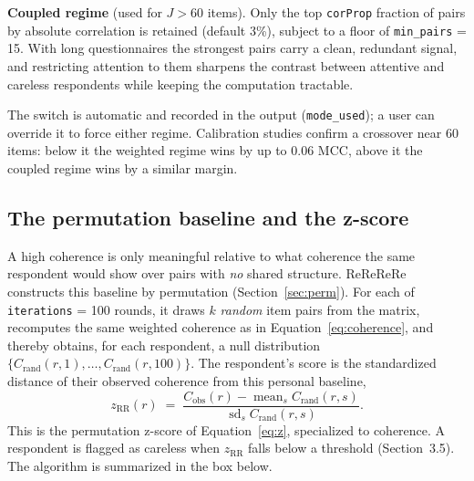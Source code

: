 \textbf{Coupled regime} (used for $J > 60$ items). Only the top
\texttt{corProp} fraction of pairs by absolute correlation is retained (default
3\%), subject to a floor of \texttt{min\_pairs} = 15. With long questionnaires
the strongest pairs carry a clean, redundant signal, and restricting attention
to them sharpens the contrast between attentive and careless respondents while
keeping the computation tractable.

The switch is automatic and recorded in the output (\texttt{mode\_used}); a user
can override it to force either regime. Calibration studies confirm a crossover
near 60 items: below it the weighted regime wins by up to $0.06$ MCC, above it
the coupled regime wins by a similar margin.

\subsection{The permutation baseline and the z-score}

A high coherence is only meaningful relative to what coherence the same
respondent would show over pairs with \emph{no} shared structure. ReReReRe
constructs this baseline by permutation (Section~\ref{sec:perm}). For each of
\texttt{iterations} = 100 rounds, it draws $k$ \emph{random} item pairs from the
matrix, recomputes the same weighted coherence as in
Equation~\ref{eq:coherence}, and thereby obtains, for each respondent, a null
distribution $\{C_{\text{rand}}(r,1), \dots, C_{\text{rand}}(r,100)\}$. The
respondent's score is the standardized distance of their observed coherence from
this personal baseline,
\begin{equation}
z_{\text{RR}}(r) \;=\;
\frac{C_{\text{obs}}(r) - \operatorname{mean}_s C_{\text{rand}}(r,s)}
{\operatorname{sd}_s C_{\text{rand}}(r,s)} .
\label{eq:zrr}
\end{equation}
This is the permutation z-score of Equation~\ref{eq:z}, specialized to coherence.
A respondent is flagged as careless when $z_{\text{RR}}$ falls below a
threshold (Section~3.5). The algorithm is summarized in the box below.

